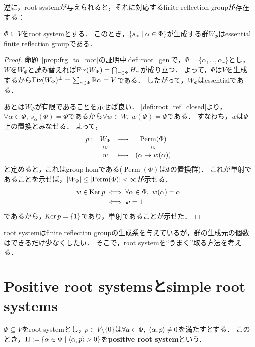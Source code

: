 逆に，root systemが与えられると，それに対応するfinite reflection groupが存在する：
\begin{proposition}
  $\Phi \subseteq V$をroot systemとする．
  このとき，$\left\lbrace s_\alpha \mathrel{} \middle| \mathrel{} \alpha \in \Phi \right\rbrace$が生成する群$W_\Phi$はessential finite reflection groupである．
\end{proposition}
\begin{proof}
  命題~\ref{prop:frg_to_root}の証明中\ref{defi:root_gen}で，$\Phi = \{\alpha_1 \ldots, \alpha_r\}$とし，$W$を$W_\Phi$と読み替えれば$\operatorname{Fix}(W_\Phi) = \bigcap_{\alpha \in \Phi} H_\alpha$が成り立つ．
  よって，$\Phi$は$V$を生成するから$\operatorname{Fix}(W_\Phi)^\perp = \sum_{\alpha \in \Phi} \mathbb{R}\alpha = V$である．
  したがって，$W_\Phi$はessentialである．

  あとは$W_\Phi$が有限であることを示せば良い．
  \ref{defi:root_ref_closed}より，$\forall \alpha \in \Phi,\ s_\alpha(\Phi) = \Phi$であるから$\forall w \in W,\ w(\Phi) = \Phi$である．
  すなわち，$w$は$\Phi$上の置換とみなせる．
  よって，
  \begin{equation}
    \begin{array}{rccc}
    p:&W_\Phi & \longrightarrow & \operatorname{Perm}(\Phi) \\
    &\rotatebox[origin=c]{90}{$\in$} & & \rotatebox[origin=c]{90}{$\in$} \\
    &w & \longmapsto & (\alpha \mapsto w(\alpha))
    \end{array}
  \end{equation}
  と定めると，これはgroup homである($\operatorname{Perm}(\Phi)$は$\Phi$の置換群)．
  これが単射であることを示せば，$\left| W_\Phi \right| \le \left| \operatorname{Perm}(\Phi) \right| < \infty$が示せる．
  \begin{align}
    w \in \operatorname{Ker} p
    &\iff \forall \alpha \in \Phi,\ w(\alpha) = \alpha\\
    &\iff w = 1
  \end{align}
  であるから，$\operatorname{Ker} p = \{1\}$であり，単射であることが示せた．
\end{proof}

root systemはfinite reflection groupの生成系を与えているが，群の生成元の個数はできるだけ少なくしたい．
そこで，root systemを``うまく''取る方法を考える．

\section{Positive root systemsとsimple root systems}
\begin{definition}
  $\Phi \subseteq V$をroot systemとし，$p \in V \setminus \{0\}$は$\forall \alpha \in \Phi,\ \left\langle \alpha, p \right\rangle \ne 0$を満たすとする．
  このとき，$\Pi := \left\lbrace \alpha \in \Phi \mathrel{} \middle| \mathrel{} \left\langle \alpha, p \right\rangle > 0 \right\rbrace$を\textbf{positive root system}という．
\end{definition}

